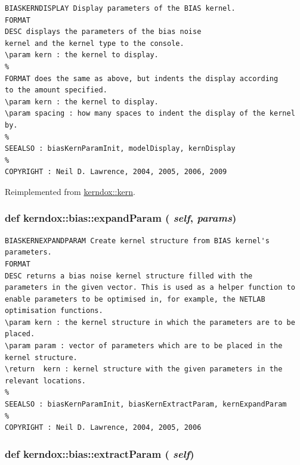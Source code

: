 \footnotesize\begin{verbatim}BIASKERNDISPLAY Display parameters of the BIAS kernel.
FORMAT
DESC displays the parameters of the bias noise
kernel and the kernel type to the console.
\param kern : the kernel to display.
%
FORMAT does the same as above, but indents the display according
to the amount specified.
\param kern : the kernel to display.
\param spacing : how many spaces to indent the display of the kernel by.
%
SEEALSO : biasKernParamInit, modelDisplay, kernDisplay
%
COPYRIGHT : Neil D. Lawrence, 2004, 2005, 2006, 2009

\end{verbatim}
\normalsize
 

Reimplemented from \hyperlink{classkerndox_1_1kern}{kerndox::kern}.\hypertarget{classkerndox_1_1bias_a884620ce9dd942d85f25f3de4703a31}{
\subsubsection[{expandParam}]{\setlength{\rightskip}{0pt plus 5cm}def kerndox::bias::expandParam ( {\em self}, \/   {\em params})}}
\label{classkerndox_1_1bias_a884620ce9dd942d85f25f3de4703a31}




\footnotesize\begin{verbatim}BIASKERNEXPANDPARAM Create kernel structure from BIAS kernel's parameters.
FORMAT
DESC returns a bias noise kernel structure filled with the
parameters in the given vector. This is used as a helper function to
enable parameters to be optimised in, for example, the NETLAB
optimisation functions.
\param kern : the kernel structure in which the parameters are to be
placed.
\param param : vector of parameters which are to be placed in the
kernel structure.
\return  kern : kernel structure with the given parameters in the
relevant locations.
%
SEEALSO : biasKernParamInit, biasKernExtractParam, kernExpandParam
%
COPYRIGHT : Neil D. Lawrence, 2004, 2005, 2006

\end{verbatim}
\normalsize
 \hypertarget{classkerndox_1_1bias_af12f2b815114cc8b2203236ff333364}{
\subsubsection[{extractParam}]{\setlength{\rightskip}{0pt plus 5cm}def kerndox::bias::extractParam ( {\em self})}}
\label{classkerndox_1_1bias_af12f2b815114cc8b2203236ff333364}




